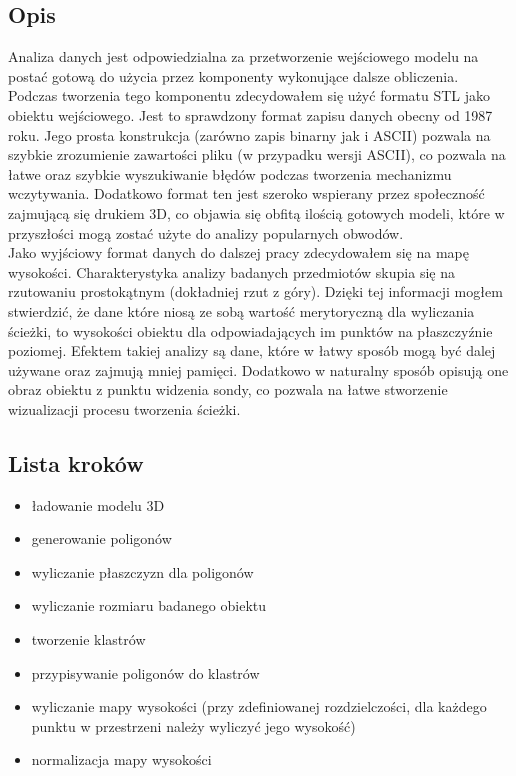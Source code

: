 \documentclass[a4paper,12pt,twoside,openany]{report}
\begin{document}
    \subsection{Opis}
      Analiza danych jest odpowiedzialna za przetworzenie wejściowego 
      modelu na postać gotową do użycia przez komponenty wykonujące dalsze obliczenia.
      Podczas tworzenia tego komponentu zdecydowałem się użyć formatu STL jako obiektu wejściowego.
      Jest to sprawdzony format zapisu danych obecny od 1987 roku. 
      Jego prosta konstrukcja (zarówno zapis binarny jak i ASCII)
      pozwala na szybkie zrozumienie zawartości pliku (w przypadku wersji ASCII), 
      co pozwala na łatwe oraz szybkie wyszukiwanie błędów
      podczas tworzenia mechanizmu wczytywania. Dodatkowo format ten jest 
      szeroko wspierany przez społeczność zajmującą się drukiem 3D,
      co objawia się obfitą ilością gotowych modeli, które w przyszłości mogą 
      zostać użyte do analizy popularnych obwodów.\\
      Jako wyjściowy format danych do dalszej pracy zdecydowałem się na mapę wysokości.
      Charakterystyka analizy badanych przedmiotów skupia się na rzutowaniu prostokątnym
      (dokładniej rzut z góry). Dzięki tej informacji mogłem stwierdzić, 
      że dane które niosą ze sobą wartość merytoryczną dla wyliczania ścieżki,
      to wysokości obiektu dla odpowiadających im punktów na płaszczyźnie poziomej.
      Efektem takiej analizy są dane, które w łatwy sposób mogą być dalej używane oraz 
      zajmują mniej pamięci. Dodatkowo w naturalny sposób opisują one obraz obiektu 
      z punktu widzenia sondy, co pozwala na łatwe stworzenie wizualizacji procesu tworzenia ścieżki.
    
    \subsection{Lista kroków}
      \begin{itemize}
        \item ładowanie modelu 3D
        \item generowanie poligonów
        \item wyliczanie płaszczyzn dla poligonów
        \item wyliczanie rozmiaru badanego obiektu
        \item tworzenie klastrów
        \item przypisywanie poligonów do klastrów
        \item wyliczanie mapy wysokości (przy zdefiniowanej rozdzielczości, dla każdego punktu w przestrzeni należy wyliczyć jego wysokość)
        \item normalizacja mapy wysokości
      \end{itemize}
\end{document}
